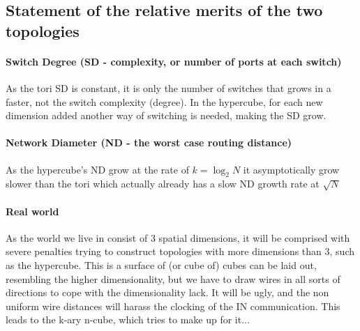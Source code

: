 \documentclass[a4paper,10pt]{article}
\begin{document}
\subsection{Statement of the relative merits of the two topologies}
\paragraph{Switch Degree (SD - complexity, or number of ports at each switch)}
As the tori SD is constant, it is only the number of switches that grows in a faster, not the switch complexity (degree).
In the hypercube, for each new dimension added another way of switching is needed, making the SD grow.

\paragraph{Network Diameter (ND - the worst case routing distance)}
As the hypercube's ND grow at the rate of $k = \log_2 N$ it asymptotically grow slower than the tori which actually already has a slow ND growth rate at $\sqrt{N}$

\paragraph{Real world}
As the world we live in consist of 3 spatial dimensions, it will be comprised with severe penalties trying to construct topologies with more dimensions than 3, such as the hypercube. This is a surface of (or cube of) cubes can be laid out, resembling the higher dimensionality, but we have to draw wires in all sorts of directions to cope with the dimensionality lack. It will be ugly, and the non uniform wire distances will harass the clocking of the IN communication. This leads to the k-ary n-cube, which tries to make up for it...
\end{document}

